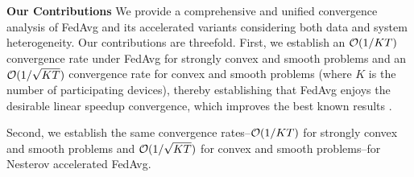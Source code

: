 \textbf{Our Contributions}
We provide a comprehensive and unified convergence analysis
of FedAvg and its accelerated variants considering both data and system heterogeneity. 
Our contributions are threefold.
First, we establish an {\small{${\mathcal{O}}(1/KT)$}} convergence rate  under FedAvg for strongly convex and smooth problems and  an
{\small{${\mathcal{O}}(1/\sqrt{KT})$}} convergence rate for convex
and smooth problems (where $K$ is the number of participating devices), thereby establishing that FedAvg enjoys the desirable linear speedup convergence, which improves the best known results\cite{li2019convergence,karimireddy2019scaffold} .
\begin{comment}
Prior to our work here, the best and the most related convergence analysis is given by \cite{li2019convergence} and~\cite{karimireddy2019scaffold}, which established an $\cO(\frac{1}{T})$ convergence rate for strongly convex smooth problems under FedAvg. Our rate matches the same (and optimal) dependence on $T$, but also completes the picture by establishing the linear dependence on $K$, for any $K\leq N$, where $N$ is the total number of devices, whereas~\cite{li2019convergence} does not have linear speedup analysis, and~\cite{karimireddy2019scaffold} only allows linear speedup close to full participation ($K=\mathcal{O}(N)$). As for convex and smooth problems, there was no prior work that established the {\small{$\cO(\frac{1}{\sqrt{T}})$}} rate under both system and data heterogeneity. Our unified analysis highlights the common elements and distinctions between the strongly and convex settings.
\end{comment}
Second, we establish the same convergence rates--{\small{${\mathcal{O}}(1/KT)$}} for strongly convex and smooth problems and {\small{${\mathcal{O}}(1/\sqrt{KT})$}} for convex and smooth problems--for Nesterov accelerated FedAvg. 
\begin{comment}
We analyze the accelerated version of FedAvg here because empirically it tends to perform better; yet, its theoretical convergence guarantee is unknown. To the best of our knowledge, these are the first results that provide a linear speedup characterization of Nesterov accelerated FedAvg in those two problem classes (that FedAvg and Nesterov accelerated FedAvg share the same convergence rate is to be expected: this is the case even for centralized stochastic optimization). Prior to our results here, the most relevant results~\cite{yu2019linear,li2018federated,huo2020faster} only concern the non-convex setting, where convergence is measured with respect to stationary points (vanishing of gradient norms, rather than optimality gaps). Our unified analysis of Nesterov FedAvg also illustrates the technical similarities and distinctions compared to the original FedAvg algorithm, whereas prior works (in the non-convex setting) were scattered and used different notations.
\end{comment}
